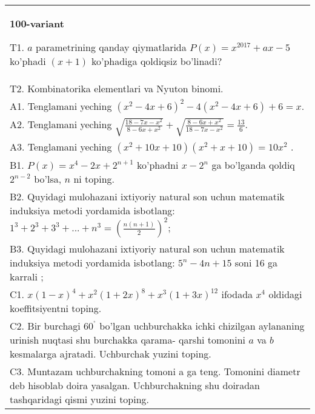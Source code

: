\documentclass{article}
\begin{document}
\begin{tabular}{m{17cm}}
\textbf{100-variant}
\newline

T1. \(a\) parametrining qanday qiymatlarida \(P(x) = x^{2017} + ax - 5\) ko'phadi \((x + 1)\) ko'phadiga qoldiqsiz bo'linadi? \\
T2. Kombinatorika elementlari va Nyuton binomi. \\
A1. Tenglamani yeching \(\left( x^{2} - 4x + 6 \right)^{2} - 4\left( x^{2} - 4x + 6 \right) + 6 = x\). \\
A2. Tenglamani yeching \(\sqrt{\frac{18 - 7x - x^{2}}{8 - 6x + x^{2}}} + \sqrt{\frac{8 - 6x + x^{2}}{18 - 7x - x^{2}}} = \frac{13}{6}\). \\
A3. Tenglamani yeching \(\left( x^{2} + 10x + 10 \right)\left( x^{2} + x + 10 \right) = 10x^{2}\) . \\
B1. \(P(x) = x^{4} - 2x + 2^{n + 1}\) ko'phadni \(x - 2^{n}\) ga bo'lganda qoldiq \(2^{n - 2}\) bo'lsa, \(n\) ni toping. \\
B2. Quyidagi mulohazani ixtiyoriy natural son uchun matematik induksiya metodi yordamida isbotlang: \(1^{3} + 2^{3} + 3^{3} + ... + n^{3} = \left( \frac{n(n + 1)}{2} \right)^{2}\); \\
B3. Quyidagi mulohazani ixtiyoriy natural son uchun matematik induksiya metodi yordamida isbotlang: \(5^{n} - 4n + 15\) soni 16 ga karrali ; \\
C1. \(x(1 - x)^{4} + x^{2}(1 + 2x)^{8} + x^{3}(1 + 3x)^{12}\) ifodada \(x^{4}\) oldidagi koeffitsiyentni toping. \\
C2. Bir burchagi \(60^{{^\circ}}\) bo'lgan uchburchakka ichki chizilgan aylananing urinish nuqtasi shu burchakka qarama- qarshi tomonini \(a\) va \(b\) kesmalarga ajratadi. Uchburchak yuzini toping. \\
C3. Muntazam uchburchakning tomoni a ga teng. Tomonini diametr deb hisoblab doira yasalgan. Uchburchakning shu doiradan tashqaridagi qismi yuzini toping. \\

\end{tabular}
\vspace{1cm}
\end{document}
